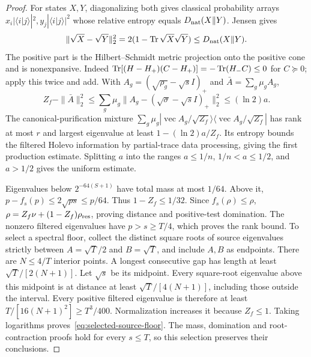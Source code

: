 \begin{proof}
For states $X,Y$, diagonalizing both gives classical probability arrays
$x_i|\langle i|j\rangle|^2,y_j|\langle i|j\rangle|^2$ whose relative
entropy equals $D_{\rm nat}(X\Vert Y)$. Jensen gives
\[
 \|\sqrt X-\sqrt Y\|_2^2=2(1-\operatorname{Tr}\sqrt X\sqrt Y)
 \leq D_{\rm nat}(X\Vert Y).
\]
The positive part is the Hilbert--Schmidt metric projection onto the
positive cone and is nonexpansive. Indeed
$\operatorname{Tr}[(H-H_+)(C-H_+)]=-\operatorname{Tr}(H_-C)\leq0$ for $C\succeq0$;
apply this twice and add. With
$A_g=(\sqrt{\rho_g}-\sqrt sI)_+$ and
$\bar A=\sum_g\mu_gA_g$,
\[
 Z_f-\|\bar A\|_2^2
 \leq\sum_g\mu_g\|A_g-(\sqrt\sigma-\sqrt sI)_+\|_2^2
 \leq(\ln2)a.
\]
The canonical-purification mixture
$\sum_g\mu_g|\operatorname{vec}A_g/\sqrt{Z_f}\rangle
\langle\operatorname{vec}A_g/\sqrt{Z_f}|$ has rank at most $r$
and largest eigenvalue at least $1-(\ln2)a/Z_f$. Its entropy bounds
the filtered Holevo information by partial-trace data processing,
giving the first production estimate. Splitting $a$ into the ranges
$a\leq1/n$, $1/n<a\leq1/2$, and $a>1/2$ gives the uniform estimate.

Eigenvalues below $2^{-64(S+1)}$ have total mass at most $1/64$.
Above it, $p-f_s(p)\leq2\sqrt{ps}\leq p/64$. Thus
$1-Z_f\leq1/32$. Since $f_s(\rho)\leq\rho$,
$\rho=Z_f\nu+(1-Z_f)\rho_{\rm res}$, proving distance and
positive-test domination. The nonzero filtered eigenvalues have
$p>s\geq T/4$, which proves the rank bound. To select a spectral floor,
collect the distinct square roots of source eigenvalues strictly between
$A=\sqrt T/2$ and $B=\sqrt T$, and include $A,B$ as endpoints.
There are $N\leq4/T$ interior points. A longest consecutive gap has
length at least $\sqrt T/[2(N+1)]$. Let $\sqrt s$ be its midpoint.
Every square-root eigenvalue above this midpoint is at distance at
least $\sqrt T/[4(N+1)]$, including those outside the interval.
Every positive filtered eigenvalue is therefore at least
$T/[16(N+1)^2]\geq T^3/400$. Normalization increases it because
$Z_f\leq1$. Taking logarithms proves~\eqref{eq:selected-source-floor}.
The mass, domination and root-contraction proofs hold for every
$s\leq T$, so this selection preserves their conclusions.


\end{proof}
